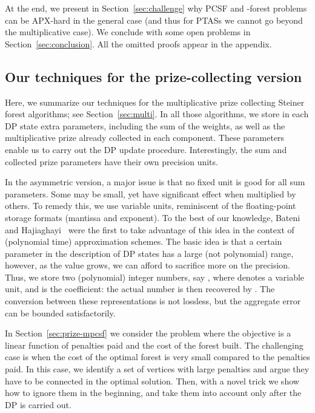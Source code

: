 \documentclass[extras,11pt]{article} \usepackage{fullpage}
\theoremstyle{mytheorem}
\begin{document}
At the end, we present in Section~\ref{sec:challenge} why PCSF and
-forest problems can be APX-hard in the general case (and thus
for PTASs we cannot go beyond the multiplicative case). We conclude
with some open problems in Section~\ref{sec:conclusion}. All the
omitted proofs appear in the appendix.




\subsection{Our techniques for the prize-collecting version}
Here, we summarize our techniques for the multiplicative prize collecting Steiner forest algorithms; see Section~\ref{sec:multi}.
In all those algorithms, we store in each DP state extra parameters,
including 
the sum of the weights, as well as the multiplicative prize already collected in each component.
These parameters enable us to carry out the DP update procedure.
Interestingly, the sum and collected prize parameters have their own precision units.

In the asymmetric version, a major issue is that no fixed unit is good for all sum parameters.  
Some may be small, yet have significant effect when multiplied by others.
To remedy this, we use variable units, reminiscent of the floating-point  storage formats (mantissa and exponent).
To the best of our knowledge, Bateni and Hajiaghayi~\cite{BH09:facility} were the first to take advantage of this idea in the context of (polynomial time) approximation schemes.
The basic idea is that a certain parameter in the description of DP states has a large (not polynomial) range,
however, as the value grows, we can afford to sacrifice more on the precision.
Thus, we store two (polynomial) integer numbers, say , where  denotes a variable unit, and  is the coefficient: the actual number is then recovered by .
The conversion between these representations is not lossless, but the aggregate error can be bounded satisfactorily.

In Section~\ref{sec:prize-mpcsf} we consider the problem where the objective is a linear function of penalties paid and the cost of the forest built.
The challenging case is when the cost of the optimal forest is very small compared to the penalties paid.  
In this case, we identify a set of vertices with large penalties and argue they have to be connected in the optimal solution.  
Then, with a novel trick we show how to ignore them in the beginning, and take them into account only after the DP is carried out.
\end{document}
